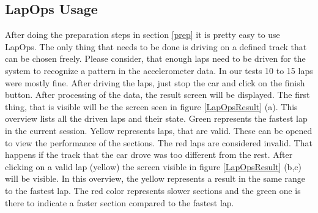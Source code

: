 \subsection{LapOps Usage}
After doing the preparation steps in section \ref{prep} it is pretty easy to use LapOps. The only thing that needs to be done is driving on a defined track that can be chosen freely. Please consider, that enough laps need to be driven for the system to recognize a pattern in the accelerometer data. In our tests 10 to 15 laps were mostly fine. After driving the laps, just stop the car and click on the finish button. After processing of the data, the result screen will be displayed. The first thing, that is visible will be the screen seen in figure \ref{LapOpsResult} (a). This overview lists all the driven laps and their state. Green represents the fastest lap in the current session. Yellow represents laps, that are valid. These can be opened to view the performance of the sections. The red laps are considered invalid. That happens if the track that the car drove was too different from the rest. After clicking on a valid lap (yellow) the screen visible in figure \ref{LapOpsResult} (b,c) will be visible. In this overview, the yellow represents a result in the same range to the fastest lap. The red color represents slower sections and the green one is there to indicate a faster section compared to the fastest lap.
